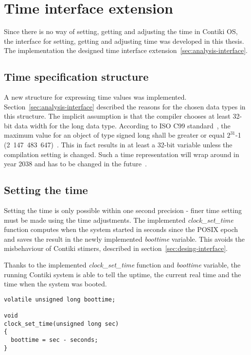 
\section{Time interface extension}
Since there is no way of setting, getting and adjusting the time in Contiki OS,
the interface for setting, getting and adjusting time was developed in this thesis.
The implementation the designed time interface extension~\ref{sec:analysis-interface}.

\subsection{Time specification structure}
A new structure for expressing time values was implemented.
Section~\ref{sec:analysis-interface} described the reasons for the chosen data types
in this structure.
The implicit assumption is that the compiler chooses at least 32-bit data width for the long data type.
According to ISO C99 standard~\cite{c99},
the maximum value for an object of type signed long
shall be greater or equal $2^{31}$-1 (2~147~483~647)~\cite{c99}.
This in fact results in at least a 32-bit variable unless the compilation setting is changed.
Such a time representation will wrap around in year 2038
and has to be changed in the future~\cite{posix}.


\subsection{Setting the time}
Setting the time is only possible within one second precision -
finer time setting must be made using the time adjustments.
The implemented {\it{clock\_set\_time}} function computes when the system started
in seconds since the POSIX epoch and saves the result in the newly implemented {\it{boottime}} variable.
This avoids the misbehaviour of Contiki stimers, described in section~\ref{sec:desing-interface}.

Thanks to the implemented {\it{clock\_set\_time}} function and {\it{boottime}} variable,
the running Contiki system is able to tell the uptime, the current real time and the time when the system was booted.
\begin{lstlisting}
volatile unsigned long boottime;

void
clock_set_time(unsigned long sec)
{
  boottime = sec - seconds;
}
\end{lstlisting}


